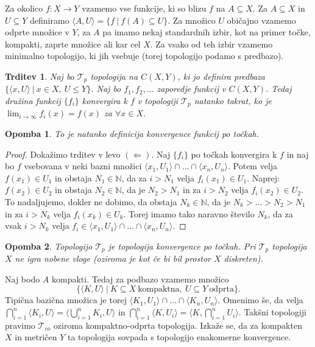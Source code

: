 \documentclass[10pt, a4paper]{article}
\newtheorem{trditev}[izr]{Trditev}
\newtheorem*{opomba}{Opomba}
\newenvironment{noticeC}{%
  \tcolorbox[%
  notitle,
  empty,
  enhanced,  %
  breakable,
  coltext=black, 
  fontupper=\rmfamily,
  parbox=false,
  noparskip,
  sharp corners,
  boxrule=-1pt,  %
  frame hidden,
  left=7pt,  %
  right=7pt,
  top=5pt,
  bottom=5pt,
  before skip=2.5ex plus 2pt,
  after skip=2.5ex plus 2pt,
  overlay unbroken and last={%
  },
  ]}
{\endtcolorbox}
\newenvironment{dokaz}%
  {\begin{noticeC}\begin{proof}}%
  {\end{proof}\end{noticeC}}
\newcommand{\N}{\mathbb {N}}
\newcommand{\sprod}[2]{\langle {#1},{#2} \rangle}
\newcommand{\topo}[1]{\mathcal{#1}}
\begin{document}
Za okolico $f: X \to Y$ vzamemo vse funkcije, ki so blizu $f$ na $A \subseteq X$.
Za $A \subseteq X$ in $U \subseteq Y$ definiramo $\sprod{A}{U} = \{f\ |\ f(A) \subseteq U\}$.
Za množico $U$ običajno vzamemo odprte množice v $Y$, za $A$ pa imamo nekaj standardnih izbir, kot na primer 
točke, kompakti, zaprte množice ali kar cel $X$.
Za vsako od teh izbir vzamemo minimalno topologijo, ki jih vsebuje (torej topologijo podamo s predbazo).

\begin{trditev}
  Naj bo $\topo{T}_p$ topologija na $C(X, Y)$, ki jo definira predbaza $\{\sprod{x}{U}\ |\ x \in X,\ U \leq Y\}$.
  Naj bo $f_1, f_2, \dots$ zaporedje funkcij v $C(X, Y)$. Tedaj družina funkcij $\{f_i\}$ 
  konvergira k $f$ v topologiji $\topo{T}_p$ natanko takrat, ko je $\lim_{i \to \infty} f_i (x) = f(x)$ za $\forall x \in X$.
\end{trditev}

\begin{opomba}
  To je natanko definicija konvergence funkcij po točkah.
\end{opomba}

\begin{dokaz}
  Dokažimo trditev v levo $(\Leftarrow)$. Naj $\{f_i\}$ po točkah
  konvergira k $f$ in naj bo $f$ vsebovana v neki bazni množici $\sprod{x_1}{U_1} \cap \dots \cap \sprod{x_n}{U_n}$.
  Potem velja $f(x_1) \in U_1$ in obstaja $N_1 \in \N$, da za $i > N_1$ velja $f_i (x_1) \in U_1$.
  Naprej: $f(x_2) \in U_2$ in obstaja $N_2 \in \N$, da je $N_2 > N_1$ in za $i > N_2 $ velja $f_i (x_2) \in U_2$.
  To nadaljujemo, dokler ne dobimo, da obstaja $N_k \in \N$, da je $N_k > \dots > N_2 > N_1$ in za $i > N_k$ velja $f_i (x_k) \in U_k$.
  Torej imamo tako naravno število $N_k$, da za vsak $i > N_k$ velja $f_i \in \sprod{x_1}{U_1} \cap \dots \cap \sprod{x_n}{U_n}$.
\end{dokaz}

\begin{opomba}
  Topologijo $\topo{T}_p$ je topologija konvergence po točkah. Pri $\topo{T}_p$ topologija $X$ ne igra nobene vloge 
  (oziroma je kot če bi bil prostor $X$ diskreten).
\end{opomba}

Naj bodo $A$ kompakti. Tedaj za podbazo vzamemo množico $$\{\sprod{K}{U}\ |\ K \subseteq X\ \mathrm{\text{kompaktna}},\ U \subseteq Y\ \mathrm{\text{odprta}}\}.$$
Tipična bazična množica je torej $\sprod{K_1}{U_1} \cap \dots \cap \sprod{K_n}{U_n}$.
Omenimo še, da velja $\bigcap_{i = 1} ^n \sprod{K_i}{U} = \sprod{\bigcup_{i = 1} ^n K_i}{U}$ in 
$\bigcap_{i = 1} ^n \sprod{K}{U_i} = \sprod{K}{\bigcap_{i = 1} ^n U_i}$.
Takšni topologiji pravimo $\topo{T}_{co}$ oziroma kompaktno-odprta topologija.
Izkaže se, da za kompakten $X$ in metričen $Y$ ta topologija sovpada s topologijo enakomerne konvergence.
\end{document}
